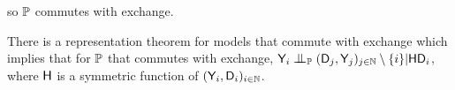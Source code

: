 so $\mathbb{P}$ commutes with exchange.

There is a representation theorem for models that commute with exchange which implies that for $\mathbb{P}$ that commutes with exchange, $\RV{Y}_i\CI_{\prob{P}}(\RV{D}_j,\RV{Y}_j)_{j\in \mathbb{N}}\setminus \{i\}|\RV{H}\RV{D}_i$, where $\mathsf{H}$ is a symmetric function of $(\mathsf{Y}_i,\mathsf{D}_i)_{i\in\mathbb{N}}$.






